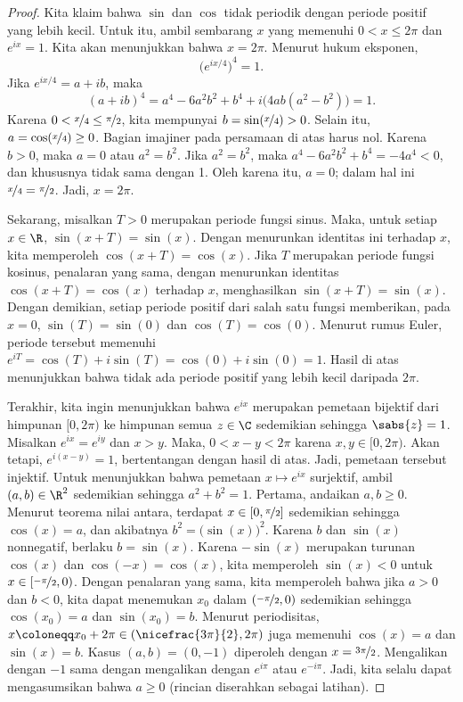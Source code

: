 \begin{proof}
Kita klaim bahwa $\sin$ dan $\cos$ tidak periodik dengan periode positif yang lebih kecil.
Untuk itu, ambil sembarang $x$ yang memenuhi $0 < x \leq 2\pi$ dan
$e^{ix} = 1$. Kita akan menunjukkan bahwa $x = 2\pi$.
Menurut hukum eksponen,
\begin{equation*}
{\bigl(e^{ix/4}\bigr)}^4 = 1 .
\end{equation*}
Jika $e^{ix/4} = a+ib$, maka
\begin{equation*}
{(a+ib)}^4
=a^4-6a^2b^2+b^4 + i\bigl(4ab(a^2-b^2)\bigr)
=1 .
\end{equation*}
Karena $0 < \nicefrac{x}{4} \leq \nicefrac{\pi}{2}$, kita mempunyai
$b = \sin(\nicefrac{x}{4}) > 0$.
Selain itu, $a = \cos(\nicefrac{x}{4}) \geq 0$. Bagian imajiner pada persamaan di atas
harus nol. Karena $b > 0$, maka $a = 0$ atau $a^2 = b^2$.
Jika $a^2=b^2$, maka
$a^4-6a^2b^2+b^4 = -4a^4 < 0$, dan khususnya tidak sama dengan 1.
Oleh karena itu, $a=0$; dalam hal ini $\nicefrac{x}{4} = \nicefrac{\pi}{2}$.
Jadi, $x = 2\pi$.

Sekarang, misalkan $T > 0$ merupakan periode fungsi sinus. Maka, untuk setiap $x \in \R$,
$\sin(x+T)=\sin(x)$. Dengan menurunkan identitas ini terhadap $x$, kita memperoleh
$\cos(x+T)=\cos(x)$. Jika $T$ merupakan periode fungsi kosinus, penalaran yang sama,
dengan menurunkan identitas $\cos(x+T)=\cos(x)$ terhadap $x$, menghasilkan
$\sin(x+T)=\sin(x)$. Dengan demikian, setiap periode positif dari salah satu fungsi
memberikan, pada $x=0$, $\sin(T)=\sin(0)$ dan $\cos(T)=\cos(0)$.
Menurut rumus Euler, periode tersebut memenuhi
$e^{iT}=\cos(T)+i\sin(T)=\cos(0)+i\sin(0)=1$.
Hasil di atas menunjukkan bahwa tidak ada periode positif yang lebih kecil daripada $2\pi$.

Terakhir, kita ingin menunjukkan bahwa $e^{ix}$ merupakan pemetaan bijektif
dari himpunan $[0,2\pi)$ ke himpunan semua $z \in \C$ sedemikian sehingga
$\sabs{z} = 1$. Misalkan $e^{ix} = e^{iy}$ dan
$x > y$. Maka,
$0 < x-y < 2\pi$ karena $x,y \in [0,2\pi)$. Akan tetapi, $e^{i(x-y)} = 1$,
bertentangan dengan hasil di atas. Jadi, pemetaan tersebut injektif.
Untuk menunjukkan bahwa pemetaan $x \mapsto e^{ix}$ surjektif, ambil $(a,b) \in \R^2$ sedemikian sehingga $a^2+b^2 = 1$.
Pertama, andaikan $a,b \geq 0$. Menurut teorema nilai antara,
terdapat $x \in [0,\nicefrac{\pi}{2}]$ sedemikian sehingga
$\cos(x) = a$, dan akibatnya $b^2 = \bigl(\sin(x)\bigr)^2$. Karena
$b$ dan $\sin(x)$ nonnegatif, berlaku $b = \sin(x)$.
Karena $-\sin(x)$ merupakan turunan $\cos(x)$
dan $\cos(-x) = \cos(x)$,
kita memperoleh $\sin(x) < 0$ untuk $x \in [\nicefrac{-\pi}{2},0)$.
Dengan penalaran yang sama, kita memperoleh bahwa
jika $a > 0$ dan $b < 0$, kita dapat menemukan $x_0$ dalam $(\nicefrac{-\pi}{2},0)$
sedemikian sehingga $\cos(x_0) = a$ dan $\sin(x_0)=b$. Menurut periodisitas,
$x \coloneqq x_0+2\pi \in (\nicefrac{3\pi}{2},2\pi)$ juga memenuhi
$\cos(x) = a$ dan $\sin(x)=b$. Kasus $(a,b)=(0,-1)$ diperoleh dengan $x=\nicefrac{3\pi}{2}$.
Mengalikan dengan $-1$ sama dengan mengalikan dengan $e^{i\pi}$ atau
$e^{-i\pi}$. Jadi, kita selalu dapat mengasumsikan bahwa $a \geq 0$ (rincian diserahkan
sebagai latihan).
\end{proof}

